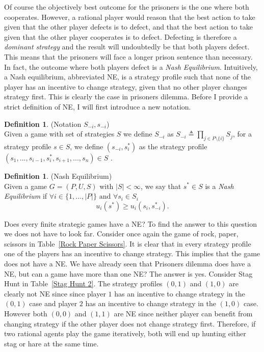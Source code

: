 \documentclass{article}
\theoremstyle{definition}
\newtheorem{definition}[theorem]{Definition}
\theoremstyle{remark}
\begin{document}
Of course the objectively best outcome for the prisoners is the one
where both cooperates. However, a rational player would reason that the
best action to take given that the other player defects is to defect, and
that the best action to take given that the other player cooperates is
to defect. Defecting is therefore a \emph{dominant strategy} and the
result will undoubtedly be that both players defect. This means that
the prisoners will face a longer prison sentence than necessary. In
fact, the outcome where both players defect is a \emph{Nash
  Equilibrium}. Intuitively, a Nash equilibrium, abbreviated NE, is a
strategy profile such that none of the player has an incentive to
change strategy, given that no other player changes strategy
first. This is clearly the case in prisoners dilemma. Before I provide
a strict definition of NE, I will first introduce a new notation.

\begin{definition}(Notation $S_{-i}, s_{-i}$)\label{Notation S-i}\\
Given a game with set of strategies $S$ we define $S_{-i}$ as $S_{-i} \triangleq
\prod_{j \in P \setminus \{i\}} S_j$, for a strategy profile $s \in
S$, we define $(s_{-i},s^*_i)$ as the strategy profile
$(s_1,...,s_{i-1},s^*_i,s_{i+1},...,s_n) \in S$
\citep{Gonzalez-Diaz2010}.
\end{definition}

\begin{definition}(Nash Equilibrium)\label{NE}\\
  Given a game $G = (P,U,S)$ with $|S| < \infty$, we say that $s^* \in S$ is a
  \emph{Nash Equilibrium} if $\forall i \in
  \{1,...,|P|\} \text{ and }\forall s_i \in S_i$ $$ u_i(s^*) \geq u_i(s_i,s_{-i}^*).$$ 
\end{definition}

Does every finite strategic games have a NE? To find the answer to
this question we
does not have to look far. Consider once again the game of rock,
paper, scissors in Table~\ref{Rock Paper Scissors}. It is clear that
in every strategy profile one of the players has an incentive to
change strategy. This implies that the game does not have a NE. We
have already seen that Prisoners dilemma does have a NE, but can a
game have more than one NE? The answer is yes. Consider Stag Hunt in
Table~\ref{Stag Hunt 2}. The strategy profiles $(0,1)$ and $(1,0)$ are
clearly not NE since since player $1$ has an incentive to change
strategy in the $(0,1)$ case and player $2$ has an incentive to change
strategy in the $(1,0)$ case. However both $(0,0)$ and $(1,1)$ are NE
since neither player can benefit from changing strategy if the other
player does not change strategy first. Therefore, if two rational
agents play the game iteratively, both will end up hunting either stag
or hare at the same time.\\
\end{document}
